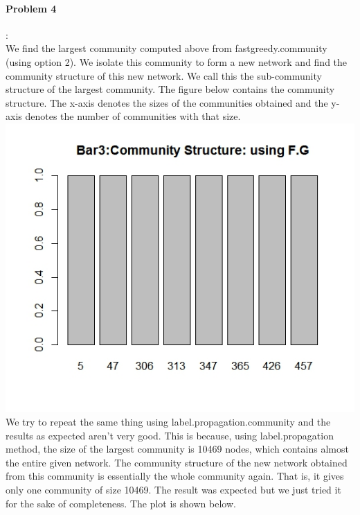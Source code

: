 \documentclass{article}
\begin{document}
\paragraph{Problem 4}:\\
We find the largest community computed above from fastgreedy.community (using option 2). We isolate this community
to form a new network and find the community structure of this new network. We call this the sub-community structure
of the largest community. 
 The figure below contains the community structure. The x-axis denotes the sizes of the communities obtained
 and the y-axis denotes the number of communities with that size.\\
 \includegraphics[scale=0.4]{p6}\\
 We try to repeat the same thing using label.propagation.community and the results as expected aren't very good.
 This is because, using label.propagation method, the size of the largest community is 10469 nodes, which contains
 almost the entire given network. The community structure of the new network obtained from this community is 
 essentially the whole community again. That is, it gives only one community of size 10469. The result was expected
 but we just tried it for the sake of completeness. The plot is shown below.\\
\end{document}

